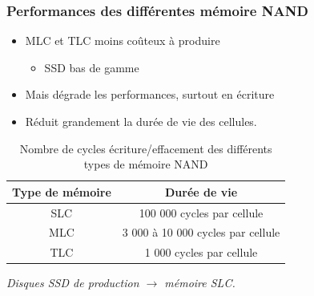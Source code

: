 \begin{frame}
\frametitle{Performances des différentes mémoire NAND}
\begin{itemize}
\item MLC et TLC moins coûteux à produire
\begin{itemize}
\item SSD bas de gamme
\end{itemize}

\item Mais dégrade les performances, surtout en écriture
\item Réduit grandement la durée de vie des cellules.
\end{itemize}

\begin{table}[htdp]
\caption{Nombre de cycles écriture/effacement des différents types de mémoire NAND}
\begin{center}
\begin{tabular}{c|c}
Type de mémoire & Durée de vie \\
\hline
SLC & 100 000 cycles par cellule \\
MLC &  3 000 à 10 000 cycles par cellule \\
TLC & 1 000 cycles par cellule \\
\end{tabular}
\end{center}
\label{default}
\end{table}
\textit{Disques SSD de production $\rightarrow$ mémoire SLC.}
\end{frame}

